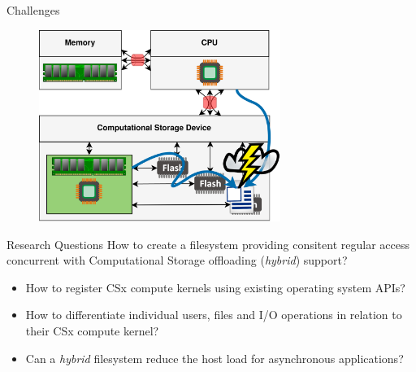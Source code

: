 \documentclass{beamer}
\begin{document}
\begin{frame}{Challenges}
	\begingroup
	\small
	\begin{figure}
		\centering
		\includegraphics[width=0.7\textwidth]{resources/images/challenges.png}
	\end{figure}
	\endgroup
\end{frame}

\begin{frame}{Research Questions}
	\begingroup
	\small
		How to create a filesystem providing consitent regular access concurrent
		with Computational Storage offloading (\textit{hybrid}) support?
	\begin{itemize}
		\item How to register CSx compute kernels using existing operating 
			  system APIs?
  		\item How to differentiate individual users, files and I/O operations in
			  relation to their CSx compute kernel?
		\item Can a \textit{hybrid} filesystem reduce the host load for
              asynchronous applications?
	\end{itemize}
	\endgroup
\end{frame}
\end{document}
